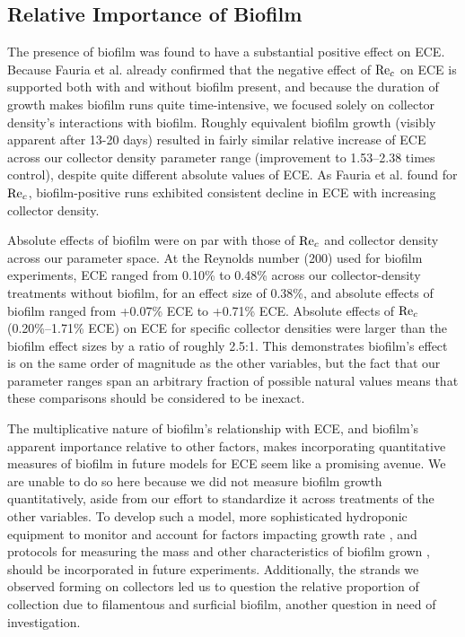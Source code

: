 \documentclass[geosciences,article,submit,moreauthors,pdftex]{Definitions/mdpi}
\begin{document}
\subsection{Relative Importance of Biofilm}

The presence of biofilm was found to have a substantial positive effect on ECE. Because Fauria et al. \cite{Fauria_2015} already confirmed that the negative effect of $\mathrm{Re}_c$ on ECE is supported both with and without biofilm present, and because the duration of growth makes biofilm runs quite time-intensive, we focused solely on collector density's interactions with biofilm. Roughly equivalent biofilm growth (visibly apparent after 13-20 days) resulted in fairly similar relative increase of ECE across our collector density parameter range (improvement to 1.53--2.38 times control), despite quite different absolute values of ECE. As Fauria et al. \cite{Fauria_2015} found for $\mathrm{Re}_c$, biofilm-positive runs exhibited consistent decline in ECE with increasing collector density.

Absolute effects of biofilm were on par with those of $\mathrm{Re}_c$ and collector density across our parameter space. At the Reynolds number (200) used for biofilm experiments, ECE ranged from 0.10\% to 0.48\% across our collector-density treatments without biofilm, for an effect size of 0.38\%, and absolute effects of biofilm ranged from +0.07\% ECE to +0.71\% ECE. Absolute effects of $\mathrm{Re}_c$ (0.20\%--1.71\% ECE) on ECE for specific collector densities were larger than the biofilm effect sizes by a ratio of roughly 2.5:1. This demonstrates biofilm's effect is on the same order of magnitude as the other variables, but the fact that our parameter ranges span an arbitrary fraction of possible natural values means that these comparisons should be considered to be inexact.

The multiplicative nature of biofilm's relationship with ECE, and biofilm's apparent importance relative to other factors, makes incorporating quantitative measures of biofilm in future models for ECE seem like a promising avenue. We are unable to do so here because we did not measure biofilm growth quantitatively, aside from our effort to standardize it across treatments of the other variables. To develop such a model, more sophisticated hydroponic equipment to monitor and account for factors impacting growth rate \cite{schnurr2014effect, trulear1982dynamics}, and protocols for measuring the mass and other characteristics of biofilm grown \cite{liu1994simple,characklis1982dynamics}, should be incorporated in future experiments. Additionally, the strands we observed forming on collectors led us to question the relative proportion of collection due to filamentous and surficial biofilm, another question in need of investigation.
\end{document}
